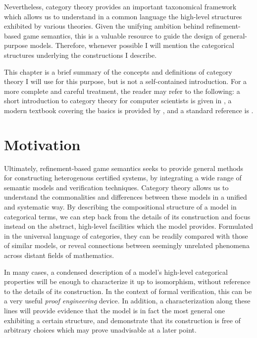 \documentclass[11pt,oneside,draft]{book}
\theoremstyle{definition}
\begin{document}
Nevertheless,
category theory provides an important
taxonomical framework
which allows us to understand
in a common language
the high-level structures
exhibited by various theories.
Given the unifying ambition behind
refinement-based game semantics,
this is a valuable resource
to guide the design of general-purpose models.
Therefore,
whenever possible I will mention the categorical structures
underlying the constructions I describe.

This chapter is a brief summary of the concepts and definitions
of category theory I will use for this purpose,
but is not a self-contained introduction.
For a more complete and careful treatment,
the reader may refer to the following:
a short introduction to category theory for computer scientists
is given in \citet{ctcs},
a modern textbook covering the basics is provided by \cite{awodeyct},
and a standard reference is \cite{maclane}.


\section{Motivation} %

Ultimately,
refinement-based game semantics seeks
to provide general methods for
constructing heterogenous certified systems,
by integrating a wide range of
semantic models and verification techniques.
Category theory allows us to
understand the commonalities and differences
between these models
in a unified and systematic way.
By describing the compositional structure of a model
in categorical terms,
we can step back from the details of its construction
and focus instead on
the abstract, high-level facilities which the model provides.
Formulated
in the universal language of categories,
they can be readily compared with those of similar models,
or reveal connections between
seemingly unrelated phenomena across
distant fields of mathematics.

In many cases,
a condensed description of
a model's high-level categorical properties
will be enough to characterize it
up to isomorphism,
without reference to the details of its construction.
In the context of formal verification,
this can be a very useful \emph{proof engineering} device.
In addition,
a characterization along these lines
will provide evidence that
the model is in fact the most general one
exhibiting a certain structure,
and demonstrate that its construction is free of arbitrary choices
which may prove unadvisable at a later point.
\end{document}
